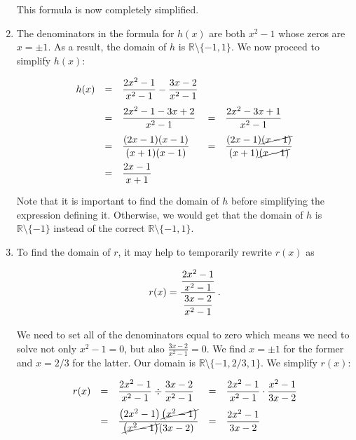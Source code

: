 \begin{example}
\begin{enumerate}
This formula is now completely simplified.

\ifcourse

\item  The denominators in the formula for $h(x)$ are both $x^2-1$ whose zeros are  $x = \pm 1$.  As a result, the domain of $h$ is $\mathbb{R}$\textbackslash$\{-1,1\}$.  We now proceed to simplify $h(x)$: 

\[ \begin{array}{rclcl}

h(x) & = & \dfrac{2x^2-1}{x^2-1} - \dfrac{3x-2}{x^2-1} &  &  \\ [.15in]
     & = & \dfrac{2x^2-1 - 3x+2}{x^2-1} & = &  \dfrac{2x^2 - 3x+1}{x^2-1} \\[.15in]
     & = & \dfrac{(2x-1)(x-1)}{(x+1)(x-1)} & = & \dfrac{(2x-1)\cancel{(x-1)}}{(x+1)\cancel{(x-1)}} \\ [.15in]
     & = & \dfrac{2x-1}{x+1} & & \\
\end{array} \]

Note that it is important to find the domain of $h$ before simplifying the expression defining it. Otherwise, we would get that the domain of $h$ is $\mathbb{R}\setminus\{-1\}$ instead of the correct $\mathbb{R}\setminus\{-1,1\}$.

\item  To find the domain of $r$, it may help to temporarily rewrite $r(x)$ as

\[ r(x) = \dfrac{\dfrac{2x^2-1}{x^2-1} }{\dfrac{3x-2}{x^2-1}\vphantom{\left(\dfrac{X}{X}\right)}}\,.\]

We need to set all of the denominators equal to zero which means we need to solve not only  $x^2-1= 0$, but also $\frac{3x-2}{x^2-1}=0$.  We find $x = \pm 1$ for the former and $x= 2/3$ for the latter.  Our domain is $\mathbb{R}$\textbackslash$\{-1,2/3,1\}$.  We simplify $r(x)$:

\[ \begin{array}{rclcl}

r(x) & = & \dfrac{2x^2-1}{x^2-1} \div \dfrac{3x-2}{x^2-1} & = & \dfrac{2x^2-1}{x^2-1} \cdot \dfrac{x^2-1}{3x-2}  \\ [.15in]
     & = & \dfrac{\left(2x^2-1\right)\cancel{\left(x^2-1\right)}}{\cancel{\left(x^2-1\right)}(3x-2)} & = & \dfrac{2x^2-1}{3x-2}  \\ 
\end{array}\]
\fi

\end{enumerate}

\end{example}

